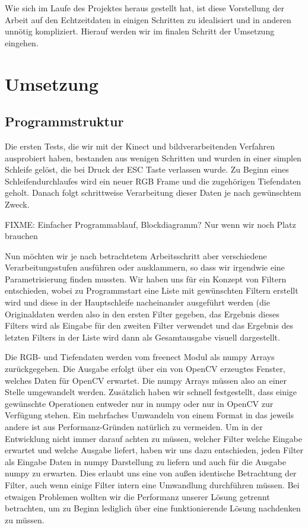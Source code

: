 \documentclass[12pt,a4paper,ngerman]{scrartcl}
\begin{document}
Wie sich im Laufe des Projektes heraus gestellt hat, ist diese Vorstellung der Arbeit 
auf den Echtzeitdaten in einigen Schritten zu idealisiert und in anderen unnötig 
kompliziert. Hierauf werden wir im finalen Schritt der Umsetzung eingehen.

\section{Umsetzung}

\subsection{Programmstruktur}

Die ersten Tests, die wir mit der Kinect und bildverarbeitenden Verfahren 
ausprobiert haben, bestanden aus wenigen Schritten und wurden in einer
simplen Schleife gelöst, die bei Druck der ESC Taste verlassen wurde. Zu Beginn
eines Schleifendurchlaufes wird ein neuer RGB Frame und die zugehörigen 
Tiefendaten geholt. Danach folgt schrittweise Verarbeitung dieser Daten je nach 
gewünschtem Zweck. 

{\color{red} FIXME: Einfacher Programmablauf, Blockdiagramm? Nur wenn wir noch Platz brauchen}

Nun möchten wir je nach betrachtetem Arbeitsschritt aber verschiedene 
Verarbeitungsstufen ausführen oder ausklammern, so dass wir irgendwie eine
Parametrisierung finden mussten. Wir haben uns für ein Konzept von Filtern 
entschieden, wobei zu Programmstart eine Liste mit gewünschten Filtern erstellt
wird und diese in der Hauptschleife nacheinander ausgeführt werden (die Originaldaten
werden also in den ersten Filter gegeben, das Ergebnis dieses Filters wird als 
Eingabe für den zweiten Filter verwendet und das Ergebnis des letzten Filters
in der Liste wird dann als Gesamtausgabe visuell dargestellt.

Die RGB- und Tiefendaten werden vom freenect Modul als numpy Arrays zurückgegeben.
Die Ausgabe erfolgt über ein von OpenCV erzeugtes Fenster, welches Daten für 
OpenCV erwartet. Die numpy Arrays müssen also an einer Stelle umgewandelt werden.
Zusätzlich haben wir schnell festgestellt, dass einige gewünschte Operationen 
entweder nur in numpy oder nur in OpenCV zur Verfügung stehen. Ein mehrfaches 
Umwandeln von einem Format in das jeweils andere ist aus Performanz-Gründen 
natürlich zu vermeiden. Um in der Entwicklung nicht immer darauf achten zu müssen,
welcher Filter welche Eingabe erwartet und welche Ausgabe liefert, haben wir uns dazu
entschieden, jeden Filter als Eingabe Daten in numpy Darstellung zu liefern und auch
für die Ausgabe numpy zu erwarten. Dies erlaubt uns eine von außen identische 
Betrachtung der Filter, auch wenn einige Filter intern eine Umwandlung durchführen 
müssen. Bei etwaigen Problemen wollten wir die Performanz unserer Lösung getrennt
betrachten, um zu Beginn lediglich über eine funktionierende Lösung nachdenken
zu müssen.
\end{document}
